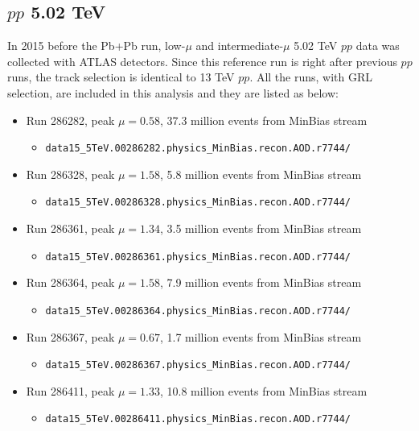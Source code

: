 \subsection{$pp$ 5.02 TeV}
In 2015 before the Pb+Pb run, low-$\mu$ and intermediate-$\mu$ 5.02 TeV $pp$ data was collected with ATLAS detectors. Since this reference run is right after previous $pp$ runs, the track selection is identical to 13 TeV $pp$. All the runs, with GRL selection, are included in this analysis and they are listed as below:
\begin{itemize}

\item Run 286282, peak $\mu=0.58$, 37.3 million events from MinBias stream
\begin{itemize}[leftmargin=*]
\item[] \verb|data15_5TeV.00286282.physics_MinBias.recon.AOD.r7744/|
\end{itemize}

\item Run 286328, peak $\mu=1.58$, 5.8 million events from MinBias stream
\begin{itemize}[leftmargin=*]
\item[] \verb|data15_5TeV.00286328.physics_MinBias.recon.AOD.r7744/|
\end{itemize}

\item Run 286361, peak $\mu=1.34$, 3.5 million events from MinBias stream
\begin{itemize}[leftmargin=*]
\item[] \verb|data15_5TeV.00286361.physics_MinBias.recon.AOD.r7744/|
\end{itemize}

\item Run 286364, peak $\mu=1.58$, 7.9 million events from MinBias stream
\begin{itemize}[leftmargin=*]
\item[] \verb|data15_5TeV.00286364.physics_MinBias.recon.AOD.r7744/|
\end{itemize}

\item Run 286367, peak $\mu=0.67$, 1.7 million events from MinBias stream
\begin{itemize}[leftmargin=*]
\item[] \verb|data15_5TeV.00286367.physics_MinBias.recon.AOD.r7744/|
\end{itemize}

\item Run 286411, peak $\mu=1.33$, 10.8 million events from MinBias stream
\begin{itemize}[leftmargin=*]
\item[] \verb|data15_5TeV.00286411.physics_MinBias.recon.AOD.r7744/|
\end{itemize}


\end{itemize}

